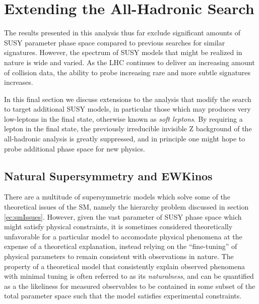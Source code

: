 \chapter{Extending the All-Hadronic Search}
\label{ch:soft}

The results presented in this analysis thus far exclude significant amounts of SUSY parameter phase space compared to previous searches for similar signatures. However, the spectrum of SUSY models that might be realized in nature is wide and varied. As the LHC continues to deliver an increasing amount of collision data, the ability to probe increasing rare and more subtle signatures increases. 

In this final section we discuss extensions to the \mttwo analysis that modify the search to target additional SUSY models, in particular those which may produces very low-\pt leptons in the final state, otherwise known as {\it soft leptons}. By requiring a lepton in the final state, the previously irreducible invisible Z background of the all-hadronic analysis is greatly suppressed, and in principle one might hope to probe additional phase space for new physics.

\section{Natural Supersymmetry and EWKinos}
\label{sec:natural}

There are a multitude of supersymmetric models which solve some of the theoretical issues of the SM, namely the hierarchy problem discussed in section \ref{ec:smIssues}. However, given the vast parameter of SUSY phase space which might satisfy physical constraints, it is sometimes considered theoretically unfavorable for a particular model to accomodate physical phenomena at the expense of a theoretical explanation, instead relying on the ``fine-tuning'' of physical parameters to remain consistent with observations in nature. The property of a theoretical model that consistently explain observed phenomena with minimal tuning is often referred to as its {\it naturalness}, and can be quantified as a the likeliness for measured observables to be contained in some subset of the total parameter space such that the model satisfies experimental constraints.

